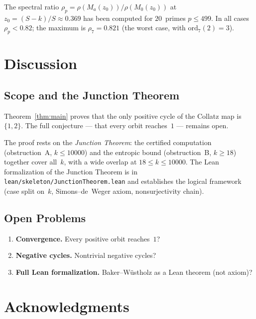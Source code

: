 \documentclass[11pt,a4paper]{article}
\theoremstyle{plain}
\theoremstyle{definition}
\newcommand{\ord}{\mathrm{ord}}
\begin{document}
The spectral ratio $\rho_p = \rho(M_a(z_0))/\rho(M_0(z_0))$ at $z_0 = (S-k)/S \approx 0.369$ has been computed for $20$~primes $p \leq 499$. In all cases $\rho_p < 0.82$; the maximum is $\rho_7 = 0.821$ (the worst case, with $\ord_7(2) = 3$).

\section{Discussion}

\subsection{Scope and the Junction Theorem}

Theorem~\ref{thm:main} proves that the only positive cycle of the Collatz map is $\{1, 2\}$. The full conjecture --- that every orbit reaches~$1$ --- remains open.

The proof rests on the \emph{Junction Theorem}: the certified computation (obstruction~A, $k \leq 10000$) and the entropic bound (obstruction~B, $k \geq 18$) together cover all~$k$, with a wide overlap at $18 \leq k \leq 10000$. The Lean formalization of the Junction Theorem is in \texttt{lean/skeleton/JunctionTheorem.lean} and establishes the logical framework (case split on~$k$, Simons--de~Weger axiom, nonsurjectivity chain).

\subsection{Open Problems}

\begin{enumerate}[label=(\alph*)]
\item \textbf{Convergence.} Every positive orbit reaches~$1$?
\item \textbf{Negative cycles.} Nontrivial negative cycles?
\item \textbf{Full Lean formalization.} Baker--W\"ustholz as a Lean theorem (not axiom)?
\end{enumerate}

\section*{Acknowledgments}
\end{document}
